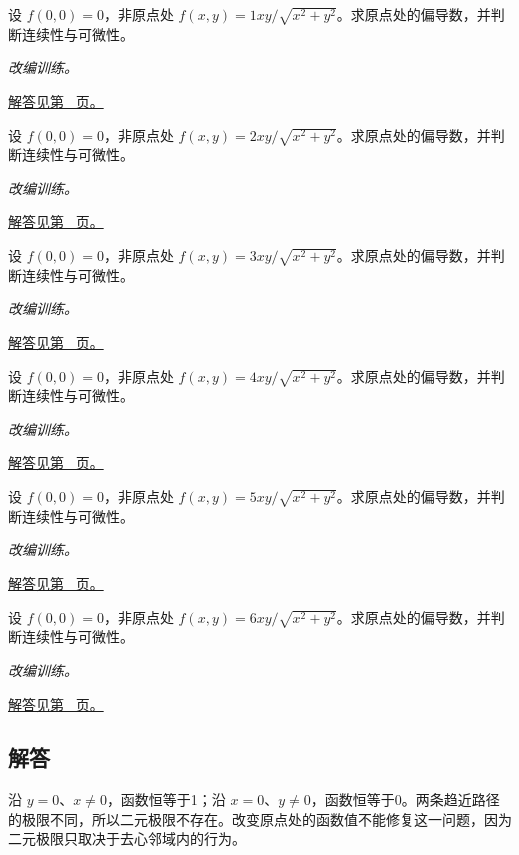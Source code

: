\documentclass[UTF8,12pt,a4paper,fontset=fandol]{ctexart}
\begin{document}
\begin{example}[偏导存在却不可微]\label{ex:c32q20}
设 $f(0,0)=0$，非原点处 $f(x,y)=1xy/\sqrt{x^2+y^2}$。求原点处的偏导数，并判断连续性与可微性。
\par\textit{改编训练。}\par\hyperref[ans:c32q20]{解答见第~\pageref{ans:c32q20} 页。}
\end{example}
\begin{example}[偏导存在却不可微]\label{ex:c32q21}
设 $f(0,0)=0$，非原点处 $f(x,y)=2xy/\sqrt{x^2+y^2}$。求原点处的偏导数，并判断连续性与可微性。
\par\textit{改编训练。}\par\hyperref[ans:c32q21]{解答见第~\pageref{ans:c32q21} 页。}
\end{example}
\begin{example}[偏导存在却不可微]\label{ex:c32q22}
设 $f(0,0)=0$，非原点处 $f(x,y)=3xy/\sqrt{x^2+y^2}$。求原点处的偏导数，并判断连续性与可微性。
\par\textit{改编训练。}\par\hyperref[ans:c32q22]{解答见第~\pageref{ans:c32q22} 页。}
\end{example}
\begin{example}[偏导存在却不可微]\label{ex:c32q23}
设 $f(0,0)=0$，非原点处 $f(x,y)=4xy/\sqrt{x^2+y^2}$。求原点处的偏导数，并判断连续性与可微性。
\par\textit{改编训练。}\par\hyperref[ans:c32q23]{解答见第~\pageref{ans:c32q23} 页。}
\end{example}
\begin{example}[偏导存在却不可微]\label{ex:c32q24}
设 $f(0,0)=0$，非原点处 $f(x,y)=5xy/\sqrt{x^2+y^2}$。求原点处的偏导数，并判断连续性与可微性。
\par\textit{改编训练。}\par\hyperref[ans:c32q24]{解答见第~\pageref{ans:c32q24} 页。}
\end{example}
\begin{example}[偏导存在却不可微]\label{ex:c32q25}
设 $f(0,0)=0$，非原点处 $f(x,y)=6xy/\sqrt{x^2+y^2}$。求原点处的偏导数，并判断连续性与可微性。
\par\textit{改编训练。}\par\hyperref[ans:c32q25]{解答见第~\pageref{ans:c32q25} 页。}
\end{example}
\subsection{解答}
\begin{solve}\label{ans:c32q1}
沿 $y=0$、$x\ne0$，函数恒等于1；沿 $x=0$、$y\ne0$，函数恒等于0。两条趋近路径的极限不同，所以二元极限不存在。改变原点处的函数值不能修复这一问题，因为二元极限只取决于去心邻域内的行为。
\end{solve}
\end{document}
